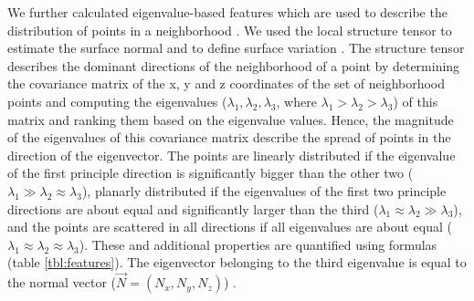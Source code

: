 We further calculated eigenvalue-based features which are used to describe the distribution of points in a neighborhood \citep{hoppe1992surface, chehata2009airborne}. We used the local structure tensor to estimate the surface normal and to define surface variation \citep{pauly2002efficient}. The structure tensor describes the dominant directions of the neighborhood of a point by determining the covariance matrix of the x, y and z coordinates of the set of neighborhood points and computing the eigenvalues (\(\lambda_{1}, \lambda_{2}, \lambda_{3}\), where \(\lambda_{1} > \lambda_{2} > \lambda_{3}\)) of this matrix and ranking them based on the eigenvalue values. Hence, the magnitude of the eigenvalues of this covariance matrix describe the spread of points in the direction of the eigenvector. The points are linearly distributed if the eigenvalue of the first principle direction is significantly bigger than the other two (\(\lambda_{1} \gg \lambda_{2} \approx \lambda_{3}\)), planarly distributed if the eigenvalues of the first two principle directions are about equal and significantly larger than the third (\(\lambda_{1} \approx \lambda_{2} \gg \lambda_{3}\)), and the points are scattered in all directions if all eigenvalues are about equal (\(\lambda_{1} \approx \lambda_{2} \approx \lambda_{3}\)). These and additional properties are quantified using formulas (table \ref{tbl:features}). The eigenvector belonging to the third eigenvalue is equal to the normal vector (\(\vec{N} = (N_{x}, N_{y}, N_{z})\)) \citep{pauly2002efficient}.

